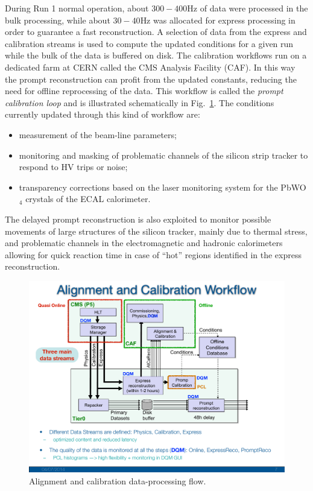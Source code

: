 During Run 1 normal operation, about $300-400$\unit{Hz} of data 
were processed in the bulk processing, while about $30-40$\unit{Hz} was allocated for express
processing in order to guarantee a fast reconstruction. A selection of
data from the express and calibration streams is used
to compute the updated conditions for a given run while the bulk of
the data is buffered on disk. The calibration workflows run on a
dedicated farm at CERN called the CMS Analysis Facility (CAF). In this
way the prompt reconstruction can profit from the updated constants,
reducing the need for offline reprocessing of the data. This workflow
is called the \emph{prompt calibration loop} and is illustrated schematically
in Fig.~\ref{fig:AlCa}. The conditions currently updated through this kind of
workflow are:
\begin{itemize}
\item measurement of the beam-line parameters;
\item monitoring and masking of problematic channels of the silicon strip tracker to respond to
HV trips or noise;
\item transparency corrections based on the laser monitoring system for the PbWO$_4$ crystals of the ECAL
  calorimeter.
\end{itemize}
The delayed prompt reconstruction is also exploited to
monitor possible movements of large structures of the silicon tracker,
mainly due to thermal stress, and problematic channels in the
electromagnetic and hadronic calorimeters allowing for quick reaction
time in case of ``hot'' regions identified in the express
reconstruction.

\begin{figure}\centering
\includegraphics[width=.9\textwidth,clip=true,viewport=0 180 900 700]{figs/cms/AlCa.pdf}
\caption{Alignment and calibration data-processing flow.\label{fig:AlCa}}
\end{figure}

